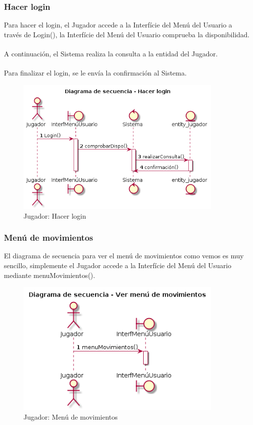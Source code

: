   
\newpage
\subsubsection{Hacer login}
  Para hacer el login, el Jugador accede a la Interfície del Menú del Usuario a través de Login(), la Interfície del Menú del Usuario comprueba la disponibilidad.\\
  \\ A continuación, el Sistema realiza la consulta a la entidad del Jugador.\\
  \\ Para finalizar el login, se le envía la confirmación al Sistema.
  
\begin{figure}[ht]
 \centering
 	  \includegraphics[width=0.9\textwidth]{./imatges/jugador/Hacer_login.png}
 \caption{Jugador: Hacer login}
 \end{figure}  
  

\newpage
\subsubsection{Menú de movimientos}
  El diagrama de secuencia para ver el menú de movimientos como vemos es muy sencillo, simplemente el Jugador accede a la Interfície del Menú del Usuario mediante menuMovimientos().
  
  
\begin{figure}[ht]
 \centering
 	  \includegraphics[width=0.9\textwidth]{./imatges/jugador/Menu_de_movimientos.png}
 \caption{Jugador: Menú de movimientos}
 \end{figure}   
   
